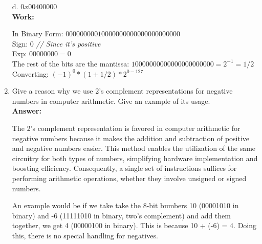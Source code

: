 \documentclass[11pt]{article}
\begin{document}
\begin{enumerate}
    d. $0x00400000$\\
    \textbf{Work:}
    \begin{center}
        In Binary Form: $0000 0000 0100 0000 0000 0000 0000 0000$\\
        Sign: $0$ \textit{// Since it's positive}\\
        Exp: $00000000 = 0$\\
        The rest of the bits are the mantissa: $100 0000 0000 0000 0000 0000 = 2^{-1} = 1/2$\\
        Converting: $(-1)^0 * (1 + 1/2) * 2^{0-127}$\\
    \end{center}
    
    \item Give a reason why we use 2's complement representations for negative numbers in computer
    arithmetic. Give an example of its usage.\\
    \textbf{Answer:}
    \begin{center}
        The 2's complement representation is favored in computer arithmetic for negative numbers because it makes the addition and subtraction of positive and negative numbers easier. 
        This method enables the utilization of the same circuitry for both types of numbers, simplifying hardware implementation and boosting efficiency. 
        Consequently, a single set of instructions suffices for performing arithmetic operations, whether they involve unsigned or signed numbers.

        An example would be if we take take the 8-bit bumbers 10 (00001010 in binary) and -6 (11111010 in binary, two's complement) and add them together, we get 4 (00000100 in binary). This is because 10 + (-6) = 4.
        Doing this, there is no special handling for negatives.\\
    \end{center}
\end{enumerate}
\end{document}
